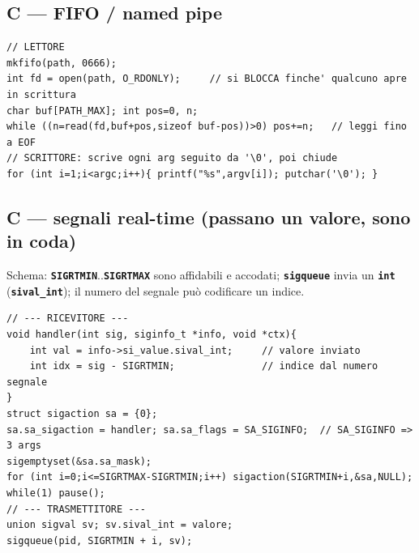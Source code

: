 \documentclass[10pt,a4paper]{article}
\newcommand{\fn}[1]{\texttt{\textbf{#1}}}
\begin{document}
\subsection{C --- FIFO / named pipe}
\begin{lstlisting}[style=c]
// LETTORE
mkfifo(path, 0666);
int fd = open(path, O_RDONLY);     // si BLOCCA finche' qualcuno apre in scrittura
char buf[PATH_MAX]; int pos=0, n;
while ((n=read(fd,buf+pos,sizeof buf-pos))>0) pos+=n;   // leggi fino a EOF
// SCRITTORE: scrive ogni arg seguito da '\0', poi chiude
for (int i=1;i<argc;i++){ printf("%s",argv[i]); putchar('\0'); }
\end{lstlisting}

\subsection{C --- segnali real-time (passano un valore, sono in coda)}
Schema: \fn{SIGRTMIN}..\fn{SIGRTMAX} sono affidabili e accodati; \fn{sigqueue} invia un \fn{int} (\fn{sival\_int}); il numero del segnale può codificare un indice.
\begin{lstlisting}[style=c]
// --- RICEVITORE ---
void handler(int sig, siginfo_t *info, void *ctx){
    int val = info->si_value.sival_int;     // valore inviato
    int idx = sig - SIGRTMIN;               // indice dal numero segnale
}
struct sigaction sa = {0};
sa.sa_sigaction = handler; sa.sa_flags = SA_SIGINFO;  // SA_SIGINFO => 3 args
sigemptyset(&sa.sa_mask);
for (int i=0;i<=SIGRTMAX-SIGRTMIN;i++) sigaction(SIGRTMIN+i,&sa,NULL);
while(1) pause();
// --- TRASMETTITORE ---
union sigval sv; sv.sival_int = valore;
sigqueue(pid, SIGRTMIN + i, sv);
\end{lstlisting}
\end{document}
